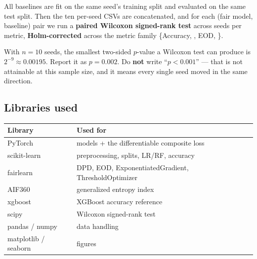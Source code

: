 All baselines are fit on the same seed's training split and evaluated on the
same test split. Then the ten per-seed CSVs are concatenated, and for each
(fair model, baseline) pair we run a \textbf{paired Wilcoxon signed-rank test}
across seeds per metric, \textbf{Holm-corrected} across the metric family
\{Accuracy, \dpdtwo{}, EOD, \getwo{}\}.

\begin{warnbox}
With $n=10$ seeds, the smallest two-sided $p$-value a Wilcoxon test can produce
is $2^{-9} \approx 0.00195$. Report it as $p = 0.002$. Do \textbf{not} write
``$p < 0.001$'' --- that is not attainable at this sample size, and it means
every single seed moved in the same direction.
\end{warnbox}

\subsection{Libraries used}

\begin{center}
\small
\begin{tabular}{@{}ll@{}}
\toprule
\textbf{Library} & \textbf{Used for} \\
\midrule
PyTorch & models + the differentiable composite loss \\
scikit-learn & preprocessing, splits, LR/RF, accuracy \\
fairlearn & DPD, EOD, ExponentiatedGradient, ThresholdOptimizer \\
AIF360 & generalized entropy index \\
xgboost & XGBoost accuracy reference \\
scipy & Wilcoxon signed-rank test \\
pandas / numpy & data handling \\
matplotlib / seaborn & figures \\
\bottomrule
\end{tabular}
\end{center}
